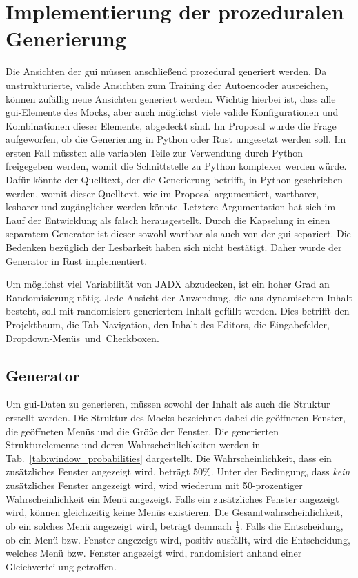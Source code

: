 \section{Implementierung der prozeduralen Generierung}
Die Ansichten der \gls{gui} müssen anschließend prozedural generiert werden. Da unstrukturierte, valide Ansichten zum Training der Autoencoder ausreichen, können zufällig neue Ansichten generiert werden. Wichtig hierbei ist, dass alle \gls{gui}-Elemente des Mocks, aber auch möglichst viele valide Konfigurationen und Kombinationen dieser Elemente, abgedeckt sind.
Im Proposal wurde die Frage aufgeworfen, ob die Generierung in Python oder Rust umgesetzt werden soll. Im ersten Fall müssten alle variablen Teile zur Verwendung durch Python freigegeben werden, womit die Schnittstelle zu Python komplexer werden würde. Dafür könnte der Quelltext, der die Generierung betrifft, in Python geschrieben werden, womit dieser Quelltext, wie im Proposal argumentiert, wartbarer, lesbarer und zugänglicher werden könnte. Letztere Argumentation hat sich im Lauf der Entwicklung als falsch herausgestellt. Durch die Kapselung in einen separatem Generator ist dieser sowohl wartbar als auch von der \gls{gui} separiert. Die Bedenken bezüglich der Lesbarkeit haben sich nicht bestätigt.
Daher wurde der Generator in Rust implementiert.

Um möglichst viel Variabilität von JADX abzudecken, ist ein hoher Grad an Randomisierung nötig. Jede Ansicht der Anwendung, die aus dynamischem Inhalt besteht, soll mit randomisiert generiertem Inhalt gefüllt werden. Dies betrifft den Projektbaum, die Tab-Navigation, den Inhalt des Editors, die Eingabefelder, Dropdown-Menüs~und~\mbox{Checkboxen}.

\subsection{Generator}
\label{subsec:generator}
Um \gls{gui}-Daten zu generieren, müssen sowohl der Inhalt als auch die Struktur erstellt werden. Die Struktur des Mocks bezeichnet dabei die geöffneten Fenster, die geöffneten Menüs und die Größe der Fenster. Die generierten Strukturelemente und deren Wahrscheinlichkeiten werden in Tab.~\ref{tab:window_probabilities} dargestellt. Die Wahrscheinlichkeit, dass ein zusätzliches Fenster angezeigt wird, beträgt $50\%$. Unter der Bedingung, dass \emph{kein} zusätzliches Fenster angezeigt wird, wird wiederum mit 50-prozentiger Wahrscheinlichkeit ein Menü angezeigt. Falls ein zusätzliches Fenster angezeigt wird, können gleichzeitig keine Menüs existieren. Die Gesamtwahrscheinlichkeit, ob ein solches Menü angezeigt wird, beträgt demnach $\frac{1}{4}$. Falls die Entscheidung, ob ein Menü bzw. Fenster  angezeigt wird, positiv ausfällt, wird die Entscheidung, welches Menü bzw. Fenster angezeigt wird, randomisiert anhand einer Gleichverteilung getroffen.

